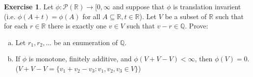 \documentclass[11pt,oneside]{article}
\numberwithin{equation}{section}
\theoremstyle{definition}
\newtheorem{exercise}{Exercise}
\def\RR{\mathbb{R}}
\def\QQ{\mathbb{Q}}
\begin{document}
\begin{exercise}
  Let $ \phi : \mathscr{P}(\RR) \to [0, \infty$ and suppose that
  $\phi$ is translation invarient (i.e. $ \phi ( A + t) = \phi (A) $
  for all $ A \subseteq \RR, t \in \RR$).  Let $V$ be a subset of $\RR$ such that
  for each $r \in \RR$ there is exactly one $v \in V$ such that $v - r \in \QQ$.
  Prove:
  \begin{enumerate}[(a)]
  \item
    Let ${r_1, r_2, ... }$ be an enumeration of $\QQ$.
    
  \item
    If $\phi$ is monotone, finitely additive, and $\phi(V + V - V) < \infty$, then
    $\phi(V) = 0$.  ($V + V - V = \{ v_1 + v_2 - v_3 : v_1, v_2, v_3 \in V\}$)
  \end{enumerate}
\end{exercise}
\end{document}
